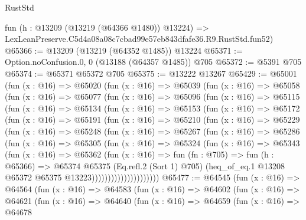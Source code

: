 \begin{lexlean}{RustStd}
\begin{coremodule}
    fun (h : @13209 (@13219 (@64366 @1480)) @13224) =>
    LexLeanPreserve.C5d4a08a08c7cbad99e57eb843dfafe36.R9.RustStd.fun52)
@65366 := @13209 (@13219 (@64352 @1485)) @13224
@65371 := Option.noConfusion.{0, 0} (@13188 (@64357 @1485)) @705
@65372 := @5391 @705
@65374 := @65371 @65372 @705
@65375 := @13222 @13267
@65429 := @65001
    (fun (x : @16) =>
    @65020
      (fun (x : @16) =>
      @65039
        (fun (x : @16) =>
        @65058
          (fun (x : @16) =>
          @65077
            (fun (x : @16) =>
            @65096
              (fun (x : @16) =>
              @65115
                (fun (x : @16) =>
                @65134
                  (fun (x : @16) =>
                  @65153
                    (fun (x : @16) =>
                    @65172
                      (fun (x : @16) =>
                      @65191
                        (fun (x : @16) =>
                        @65210
                          (fun (x : @16) =>
                          @65229
                            (fun (x : @16) =>
                            @65248
                              (fun (x : @16) =>
                              @65267
                                (fun (x : @16) =>
                                @65286
                                  (fun (x : @16) =>
                                  @65305
                                    (fun (x : @16) =>
                                    @65324
                                      (fun (x : @16) =>
                                      @65343
                                        (fun (x : @16) =>
                                        @65362
                                          (fun (x : @16) =>
                                          fun (fn : @705) =>
                                          fun (h : @65366) =>
                                          @65374
                                            @65375
                                            (Eq.refl.{2} (Sort 1) @705)
                                            (heq_of_eq.{1}
                                              @13208
                                              @65372
                                              @65375
                                              @13223)))))))))))))))))))))
@65477 := @64545
    (fun (x : @16) =>
    @64564
      (fun (x : @16) =>
      @64583
        (fun (x : @16) =>
        @64602
          (fun (x : @16) =>
          @64621
            (fun (x : @16) =>
            @64640
              (fun (x : @16) =>
              @64659
                (fun (x : @16) =>
                @64678

\end{coremodule}
\end{lexlean}

